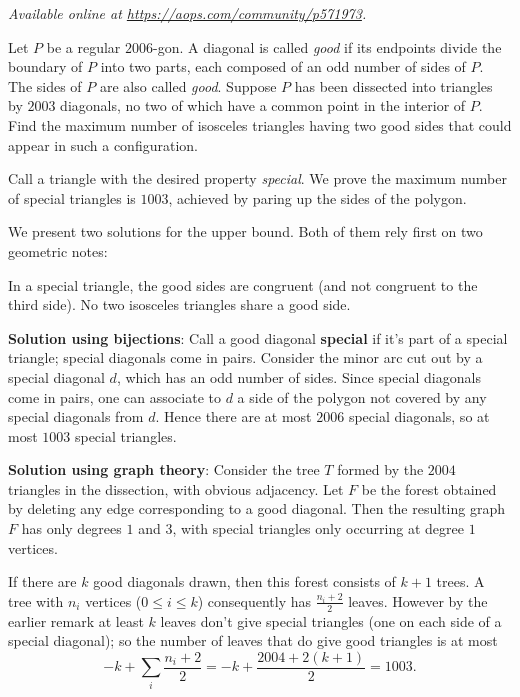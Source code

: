 \textsl{Available online at \url{https://aops.com/community/p571973}.}
\begin{mdframed}[style=mdpurplebox,frametitle={Problem statement}]
Let $P$ be a regular $2006$-gon.
A diagonal is called \emph{good} if its endpoints
divide the boundary of $P$ into two parts,
each composed of an odd number of sides of $P$.
The sides of $P$ are also called \emph{good}.
Suppose $P$ has been dissected into triangles by $2003$ diagonals,
no two of which have a common point in the interior of $P$.
Find the maximum number of isosceles triangles having two good
sides that could appear in such a configuration.
\end{mdframed}
Call a triangle with the desired property \emph{special}.
We prove the maximum number of special triangles is $1003$,
achieved by paring up the sides of the polygon.

We present two solutions for the upper bound.
Both of them rely first on two geometric notes:
\begin{itemize}
  \ii In a special triangle, the good sides are congruent
  (and not congruent to the third side).
  \ii No two isosceles triangles share a good side.
\end{itemize}

\textbf{Solution using bijections}:
Call a good diagonal \textbf{special} if it's part of a special triangle;
special diagonals come in pairs.
Consider the minor arc cut out by a special diagonal $d$,
which has an odd number of sides.
Since special diagonals come in pairs,
one can associate to $d$ a side of the polygon
not covered by any special diagonals from $d$.
Hence there are at most $2006$ special diagonals,
so at most $1003$ special triangles.

\textbf{Solution using graph theory}:
Consider the tree $T$ formed by the $2004$
triangles in the dissection, with obvious adjacency.
Let $F$ be the forest obtained by deleting
any edge corresponding to a good diagonal.
Then the resulting graph $F$ has only degrees $1$ and $3$,
with special triangles only occurring at degree $1$ vertices.

If there are $k$ good diagonals drawn,
then this forest consists of $k+1$ trees.
A tree with $n_i$ vertices ($0 \le i \le k$)
consequently has $\frac{n_i+2}{2}$ leaves.
However by the earlier remark at least $k$ leaves
don't give special triangles
(one on each side of a special diagonal);
so the number of leaves that do give good triangles is at most
\[ -k + \sum_i \frac{n_i+2}{2}
  = -k + \frac{2004 + 2(k+1)}{2} = 1003. \]
\pagebreak